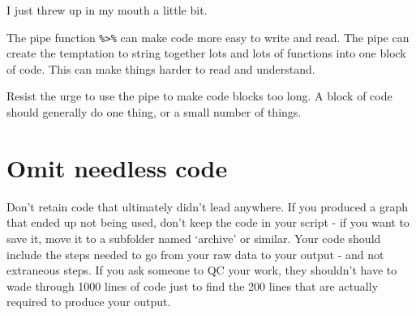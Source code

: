 \documentclass[
]{book}
\newenvironment{Shaded}{\begin{snugshade}}{\end{snugshade}}
\newcommand{\DataTypeTok}[1]{\textcolor[rgb]{0.13,0.29,0.53}{#1}}
\newcommand{\DecValTok}[1]{\textcolor[rgb]{0.00,0.00,0.81}{#1}}
\newcommand{\ErrorTok}[1]{\textcolor[rgb]{0.64,0.00,0.00}{\textbf{#1}}}
\newcommand{\KeywordTok}[1]{\textcolor[rgb]{0.13,0.29,0.53}{\textbf{#1}}}
\newcommand{\NormalTok}[1]{#1}
\newcommand{\OperatorTok}[1]{\textcolor[rgb]{0.81,0.36,0.00}{\textbf{#1}}}
\newcommand{\StringTok}[1]{\textcolor[rgb]{0.31,0.60,0.02}{#1}}
\begin{document}
\begin{Shaded}
\end{Shaded}

I just threw up in my mouth a little bit.

The pipe function \texttt{\%\textgreater{}\%} can make code more easy to write and read. The pipe can create the temptation to string together lots and lots of functions into one block of code. This can make things harder to read and understand.

Resist the urge to use the pipe to make code blocks too long. A block of code should generally do one thing, or a small number of things.

\hypertarget{omit-needless-code}{%
\section{Omit needless code}\label{omit-needless-code}}

Don't retain code that ultimately didn't lead anywhere. If you produced a graph that ended up not being used, don't keep the code in your script - if you want to save it, move it to a subfolder named `archive' or similar. Your code should include the steps needed to go from your raw data to your output - and not extraneous steps. If you ask someone to QC your work, they shouldn't have to wade through 1000 lines of code just to find the 200 lines that are actually required to produce your output.
\end{document}
